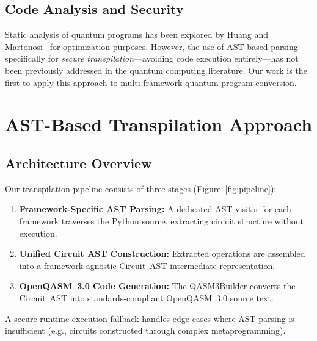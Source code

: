\documentclass[conference]{IEEEtran}
\begin{document}
\subsection{Code Analysis and Security}

Static analysis of quantum programs has been explored by Huang and Martonosi~\cite{huang2019statistical} for optimization purposes. However, the use of AST-based parsing specifically for \emph{secure transpilation}---avoiding code execution entirely---has not been previously addressed in the quantum computing literature. Our work is the first to apply this approach to multi-framework quantum program conversion.

\section{AST-Based Transpilation Approach}
\label{sec:approach}

\subsection{Architecture Overview}

Our transpilation pipeline consists of three stages (Figure~\ref{fig:pipeline}):

\begin{enumerate}
    \item \textbf{Framework-Specific AST Parsing:} A dedicated AST visitor for each framework traverses the Python source, extracting circuit structure without execution.
    \item \textbf{Unified Circuit AST Construction:} Extracted operations are assembled into a framework-agnostic Circuit~AST intermediate representation.
    \item \textbf{OpenQASM~3.0 Code Generation:} The QASM3Builder converts the Circuit~AST into standards-compliant OpenQASM~3.0 source text.
\end{enumerate}

A secure runtime execution fallback handles edge cases where AST parsing is insufficient (e.g., circuits constructed through complex metaprogramming).
\end{document}

